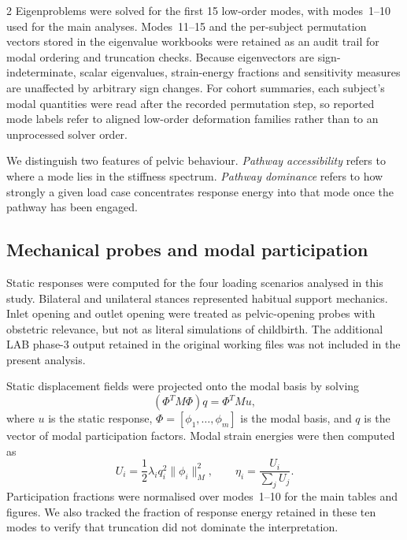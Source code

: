 \documentclass[openacc]{rsproca_new}
\begin{document}
\begin{multicols}{2}
Eigenproblems were solved for the first 15 low-order modes, with modes~1--10 used for the main analyses. Modes~11--15 and the per-subject permutation vectors stored in the eigenvalue workbooks were retained as an audit trail for modal ordering and truncation checks. Because eigenvectors are sign-indeterminate, scalar eigenvalues, strain-energy fractions and sensitivity measures are unaffected by arbitrary sign changes. For cohort summaries, each subject's modal quantities were read after the recorded permutation step, so reported mode labels refer to aligned low-order deformation families rather than to an unprocessed solver order.

We distinguish two features of pelvic behaviour. \emph{Pathway accessibility} refers to where a mode lies in the stiffness spectrum. \emph{Pathway dominance} refers to how strongly a given load case concentrates response energy into that mode once the pathway has been engaged.


\subsection{Mechanical probes and modal participation}

Static responses were computed for the four loading scenarios analysed in this study. Bilateral and unilateral stances represented habitual support mechanics. Inlet opening and outlet opening were treated as pelvic-opening probes with obstetric relevance, but not as literal simulations of childbirth. The additional LAB phase-3 output retained in the original working files was not included in the present analysis.

Static displacement fields were projected onto the modal basis by solving
\begin{equation}
(\Phi^{T}M\Phi)q = \Phi^{T}Mu,
\end{equation}
where $u$ is the static response, $\Phi=[\phi_{1},\ldots,\phi_{m}]$ is the modal basis, and $q$ is the vector of modal participation factors. Modal strain energies were then computed as
\begin{equation}
U_{i}=\frac{1}{2}\lambda_{i}q_{i}^{2}\lVert\phi_{i}\rVert_{M}^{2}, \qquad
\eta_{i}=\frac{U_{i}}{\sum_{j}U_{j}}.
\end{equation}
Participation fractions were normalised over modes~1--10 for the main tables and figures. We also tracked the fraction of response energy retained in these ten modes to verify that truncation did not dominate the interpretation.


\end{multicols}
\end{document}
